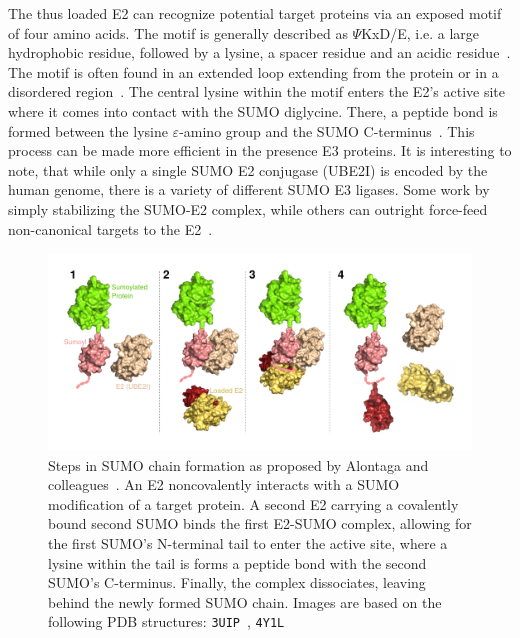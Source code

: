 The thus loaded E2 can recognize potential target proteins via an exposed motif of four amino acids. The motif is generally described as $\Psi$KxD/E, i.e. a large hydrophobic residue, followed by a lysine, a spacer residue and an acidic residue~\cite{Sampson2001}. The motif is often found in an extended loop extending from the protein or in a disordered region~. The central lysine within the motif enters the E2’s active site where it comes into contact with the SUMO diglycine. There, a peptide bond is formed between the lysine $\varepsilon$-amino group and the SUMO C-terminus~\cite{BernierVillamor2002}. This process can be made more efficient in the presence E3 proteins. It is interesting to note, that while only a single SUMO E2 conjugase (UBE2I) is encoded by the human genome, there is a variety of different SUMO E3 ligases. Some work by simply stabilizing the SUMO-E2 complex, while others can outright force-feed non-canonical targets to the E2~\cite{Streich2016}. 

\begin{figure}[h!]
	\centering
	\includegraphics[width=\textwidth]{img/sumo_chaining.pdf}
	\caption{Steps in SUMO chain formation as proposed by Alontaga and colleagues~\cite{Alontaga2015}. An E2 noncovalently interacts with a SUMO modification of a target protein. A second E2 carrying a covalently bound second SUMO binds the first E2-SUMO complex, allowing for the first SUMO's N-terminal tail to enter the active site, where a lysine within the tail is forms a peptide bond with the second SUMO's C-terminus. Finally, the complex dissociates, leaving behind the newly formed SUMO chain. Images are based on the following PDB structures: \texttt{3UIP}~\cite{Gareau2012}, \texttt{4Y1L}~\cite{Alontaga2015}}
	\label{fig:sumo_chaining}
\end{figure}

